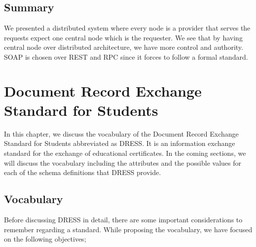 \documentclass[12pt,a4paper,oneside]{book}
\begin{document}
\section{Summary}
We presented a distributed system where every node is a provider that serves the requests expect one central node which is the requester. We see that by having central node over distributed architecture, we have more control and authority. SOAP is chosen over REST and RPC since it forces to follow a formal standard.


\chapter{Document Record Exchange Standard for Students}\label{ch-DRESS}

In this chapter, we discuss the vocabulary of the Document Record Exchange Standard for Students abbreviated as DRESS. It is an information exchange standard for the exchange of educational certificates.  
In the coming sections, we will discuss the vocabulary including the attributes and the possible values for each of the schema definitions that DRESS provide.
  




\section{Vocabulary}

Before discussing DRESS in detail, there are some important considerations to remember regarding a standard. While proposing the vocabulary, we have focused on the following objectives;
\end{document}
